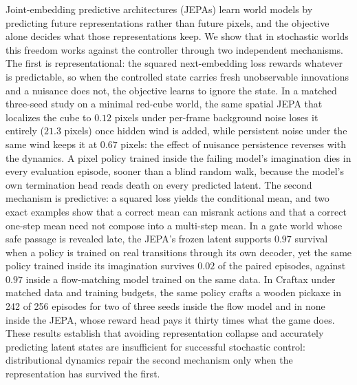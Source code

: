 Joint-embedding predictive architectures (JEPAs) learn world models by predicting future
representations rather than future pixels, and the objective alone decides what those
representations keep. We show that in stochastic worlds this freedom works against the controller
through two independent mechanisms. The first is representational: the squared next-embedding loss
rewards whatever is predictable, so when the controlled state carries fresh unobservable innovations
and a nuisance does not, the objective learns to ignore the state. In a matched three-seed study on
a minimal red-cube world, the same spatial JEPA that localizes the cube to $0.12$ pixels under
per-frame background noise loses it entirely ($21.3$ pixels) once hidden wind is added, while
persistent noise under the same wind keeps it at $0.67$ pixels: the effect of nuisance persistence
reverses with the dynamics. A pixel policy trained inside the failing model's imagination dies in
every evaluation episode, sooner than a blind random walk, because the model's own termination head
reads death on every predicted latent. The second mechanism is predictive: a squared loss yields the
conditional mean, and two exact examples show that a correct mean can misrank actions and that a
correct one-step mean need not compose into a multi-step mean. In a gate world whose safe passage
is revealed late, the JEPA's frozen latent supports $0.97$ survival when a policy is trained on
real transitions through its own decoder, yet the same policy trained inside its imagination
survives $0.02$ of the paired episodes, against $0.97$ inside a flow-matching model trained on the
same data. In Craftax under matched data and training budgets, the same policy crafts a wooden
pickaxe in 242 of 256 episodes for two of three seeds inside the flow model and in none inside the
JEPA, whose reward head pays it thirty times what the game does.
These results establish that avoiding representation collapse and accurately predicting latent
states are insufficient for successful stochastic control: distributional dynamics repair the
second mechanism only when the representation has survived the first.
